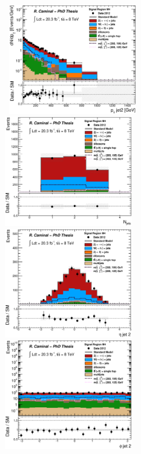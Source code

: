 \begin{figure}[!ht]
  \begin{center}
    \mbox{
      \includegraphics[width=0.495\textwidth]{MonojetAnalysis/Figures/plot_Stop_A8_SR_pt2_fitted.eps}
      \includegraphics[width=0.495\textwidth]{MonojetAnalysis/Figures/plot_Stop_A8_SR_n_jets_fitted.eps}
    }
    \mbox{
      \includegraphics[width=0.495\textwidth]{MonojetAnalysis/Figures/plot_Stop_A8_SR_eta2_fitted.eps}
      \includegraphics[width=0.495\textwidth]{MonojetAnalysis/Figures/plot_Stop_A8_SR_phi2_fitted.eps}
}
\end{center}
\end{figure}
